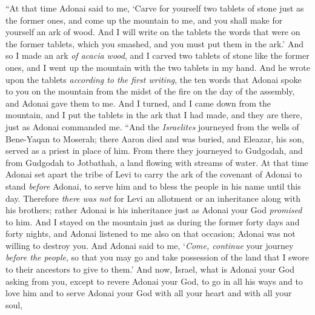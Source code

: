 \begin{biblechapter} %
\verse “At that time Adonai said to me, ‘Carve for yourself two tablets of stone just as the former ones, and come up the mountain to me, and you shall make for yourself an ark of wood.
\verse And I will write on the tablets the words that were on the former tablets, which you smashed, and you must put them in the ark.’
\verse And so I made an ark \textit{of acacia wood}, and I carved two tablets of stone like the former ones, and I went up the mountain with the two tablets in my hand.
\verse And he wrote upon the tablets \textit{according to the first writing}, the ten words that Adonai spoke to you on the mountain from the midst of the fire on the day of the assembly, and Adonai gave them to me.
\verse And I turned, and I came down from the mountain, and I put the tablets in the ark that I had made, and they are there, just as Adonai commanded me.
\verse “And the \textit{Israelites} journeyed from the wells of Bene-Yaqan to Moserah; there Aaron died and was buried, and Eleazar, his son, served as a priest in place of him.
\verse From there they journeyed to Gudgodah, and from Gudgodah to Jotbathah, a land flowing with streams of water.
\verse At that time Adonai set apart the tribe of Levi to carry the ark of the covenant of Adonai to stand \textit{before} Adonai, to serve him and to bless the people in his name until this day.
\verse Therefore \textit{there was not} for Levi an allotment or an inheritance along with his brothers; rather Adonai is his inheritance just as Adonai your God \textit{promised} to him.
\verse And I stayed on the mountain just as during the former forty days and forty nights, and Adonai listened to me also on that occasion; Adonai was not willing to destroy you.
\verse And Adonai said to me, ‘\textit{Come, continue} your journey \textit{before the people},  so that you may go and take possession of the land that I swore to their ancestors to give to them.’
\verse And now, Israel, what is Adonai your God asking from you, except to revere Adonai your God, to go in all his ways and to love him and to serve Adonai your God with all your heart and with all your soul,

\end{biblechapter}
